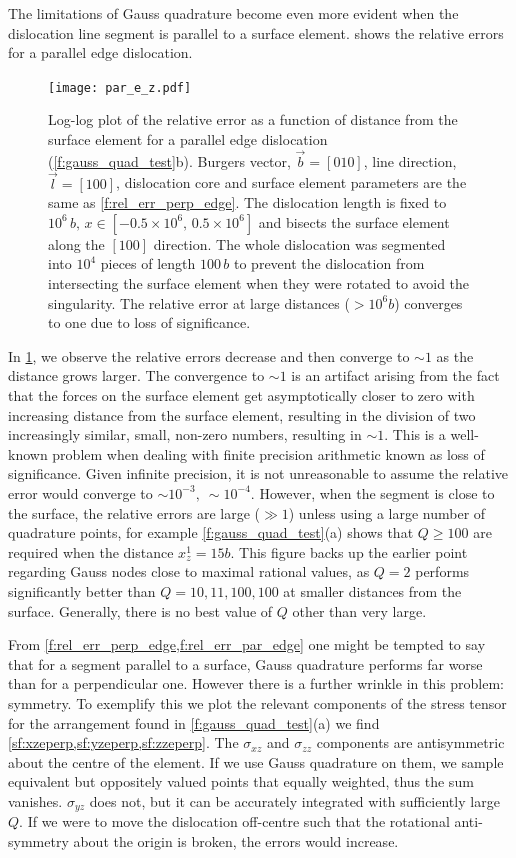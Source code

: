 \documentclass[11pt]{iopart}
\begin{document}
The limitations of Gauss quadrature become even more evident when the dislocation line segment is parallel to a surface element.  shows the relative errors for a parallel edge dislocation.
\begin{figure}
    \centering
    \texttt{[image: par\_e\_z.pdf]}
    \caption{Log-log plot of the relative error as a function of distance from the surface element for a parallel edge dislocation (\cref{f:gauss_quad_test}b). Burgers vector, $\vec{b} = [0 1 0]$, line direction, $\vec{l} = [1 0 0]$, dislocation core and surface element parameters are the same as \cref{f:rel_err_perp_edge}. The dislocation length is fixed to $10^{6}\, b,\, x\in\left[-0.5\times10^{6},\, 0.5\times10^{6} \right]$ and bisects the surface element along the $[1 0 0]$ direction. The whole dislocation was segmented into $10^4$ pieces of length $100\, b$ to prevent the dislocation from intersecting the surface element when they were rotated to avoid the singularity. The relative error at large distances ($>10^6 b$) converges to one due to loss of significance.}
    \label{f:rel_err_par_edge}
\end{figure}
In \cref{f:rel_err_par_edge}, we observe the relative errors decrease and then converge to $\sim 1$ as the distance grows larger. The convergence to $\sim 1$ is an artifact arising from the fact that the forces on the surface element get asymptotically closer to zero with increasing distance from the surface element, resulting in the division of two increasingly similar, small, non-zero numbers, resulting in $\sim 1$. This is a well-known problem when dealing with finite precision arithmetic known as loss of significance. Given infinite precision, it is not unreasonable to assume the relative error would converge to $\sim10^{-3},~ \sim10^{-4}$. However, when the segment is close to the surface, the relative errors are large ($\gg1$) unless using a large number of quadrature points, for example \cref{f:gauss_quad_test}(a) shows that $Q\geq100$ are required when the distance $x^1_z = 15b$. This figure backs up the earlier point regarding Gauss nodes close to maximal rational values, as $Q = 2$ performs significantly better than $Q = 10, 11, 100, 100$ at smaller distances from the surface. Generally, there is no best value of $Q$ other than very large.

From \cref{f:rel_err_perp_edge,f:rel_err_par_edge} one might be tempted to say that for a segment parallel to a surface, Gauss quadrature performs far worse than for a perpendicular one. However there is a further wrinkle in this problem: symmetry. To exemplify this we plot the relevant components of the stress tensor for the arrangement found in \cref{f:gauss_quad_test}(a) we find \cref{sf:xzeperp,sf:yzeperp,sf:zzeperp}. The $\sigma_{xz}$ and $\sigma_{zz}$ components are antisymmetric about the centre of the element. If we use Gauss quadrature on them, we sample equivalent but oppositely valued points that equally weighted, thus the sum vanishes. $\sigma_{yz}$ does not, but it can be accurately integrated with sufficiently large $Q$. If we were to move the dislocation off-centre such that the rotational anti-symmetry about the origin is broken, the errors would increase.
\end{document}
